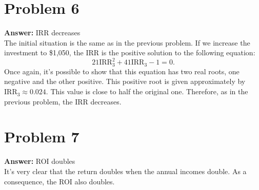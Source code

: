 \documentclass[11pt]{article}
\begin{document}
\section*{Problem 6}
\label{sec:org8777024}

\textbf{Answer:} IRR decreases\\

The initial situation is the same as in the previous problem. If we increase the
investment to \$1,050, the IRR is the positive solution to the following
equation:
\begin{equation}
21\mathrm{IRR}_3^{2}+41\mathrm{IRR}_3-1=0.
\end{equation}
Once again, it's possible to show that this equation has two real roots, one
negative and the other positive. This positive root is given approximately by
\(\mathrm{IRR}_3\approx 0.024\). This value is close to half the original one.
Therefore, as in the previous problem, the IRR decreases.
\section*{Problem 7}
\label{sec:org4032704}

\textbf{Answer:} ROI doubles\\

It's very clear that the return doubles when the annual incomes double. As a
consequence, the ROI also doubles.
\end{document}
